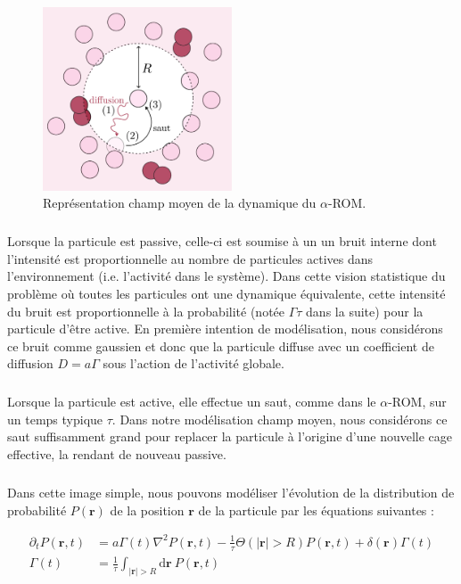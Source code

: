 \begin{figure}[h]
	\centering
	\includegraphics[width=0.5\textwidth]{Chapitre3/Figures/Interpretation/LHLModel.pdf}
	\caption{Représentation champ moyen de la dynamique du $\alpha$-ROM.}
	\label{fig:LHLmodel}
\end{figure}

\subparagraph{}Lorsque la particule est passive, celle-ci est soumise à un un bruit interne dont l'intensité est proportionnelle au nombre de particules actives dans l'environnement (i.e. l'activité dans le système). Dans cette vision statistique du problème où toutes les particules ont une dynamique équivalente, cette intensité du bruit est proportionnelle à la probabilité (notée $\Gamma\tau$ dans la suite) pour la particule d'être active. En première intention de modélisation, nous considérons ce bruit comme gaussien et donc que la particule diffuse avec un coefficient de diffusion $D=a\Gamma$ sous l'action de l'activité globale. 

\subparagraph{}Lorsque la particule est active, elle effectue un saut, comme dans le $\alpha$-ROM, sur un temps typique $\tau$. Dans notre modélisation champ moyen, nous considérons ce saut suffisamment grand pour replacer la particule à l'origine d'une nouvelle cage effective, la rendant de nouveau passive. 

\subparagraph{}Dans cette image simple, nous pouvons modéliser l'évolution de la distribution de probabilité $P(\mathbf{r})$ de la position $\mathbf{r}$ de la particule par les équations suivantes :

\begin{equation}
\begin{aligned}
    \partial_t P(\mathbf{r}, t) &= a\Gamma (t)\nabla^2 P(\mathbf{r}, t) - \frac{1}{\tau}\Theta(|\mathbf{r}|>R)P(\mathbf{r}, t) + \delta(\mathbf{r})\Gamma (t)\\ \Gamma (t) &= \frac{1}{\tau}\int_{|\mathbf{r}|>R}\mathrm{d}\mathbf{r}~P(\mathbf{r}, t)
    \label{eq:muHLDiff}
\end{aligned}
\end{equation} 

